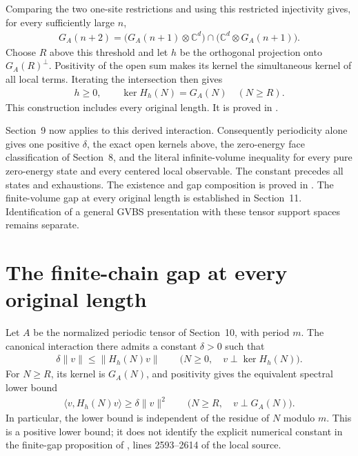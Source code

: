 \documentclass{article}
\begin{document}
Comparing the two one-site restrictions and using this restricted
injectivity gives, for every sufficiently large $n$,
\begin{align}
 G_A(n+2)=\bigl(G_A(n+1)\otimes\mathbb C^d\bigr)
             \cap\bigl(\mathbb C^d\otimes G_A(n+1)\bigr).
\end{align}
Choose $R$ above this threshold and let $h$ be the orthogonal projection onto
$G_A(R)^\perp$. Positivity of the open sum makes its kernel the simultaneous
kernel of all local terms. Iterating the intersection then gives
\begin{align}
 h\geq0,\qquad \ker H_h(N)=G_A(N)\quad(N\geq R).
\end{align}
This construction includes every original length. It is proved in
.

Section~9 now applies to this derived interaction. Consequently periodicity
alone gives one positive $\delta$, the exact open kernels above, the
zero-energy face classification of Section~8, and the literal
infinite-volume inequality for every pure zero-energy state and every
centered local observable. The constant precedes all states and exhaustions.
The existence and gap composition is proved in
.
The finite-volume gap at every original length is established in
Section~11. Identification of a general GVBS presentation with these tensor
support spaces remains separate.

\section{The finite-chain gap at every original length}

Let $A$ be the normalized periodic tensor of Section~10, with period $m$.
The canonical interaction there admits a constant $\delta>0$ such that
\begin{align}
  \delta\|v\|\leq\|H_h(N)v\|
  \qquad\bigl(N\geq0,\quad v\perp\ker H_h(N)\bigr).
\end{align}
For $N\geq R$, its kernel is $G_A(N)$, and positivity gives the equivalent
spectral lower bound
\begin{align}
  \langle v,H_h(N)v\rangle\geq\delta\|v\|^2
  \qquad\bigl(N\geq R,\quad v\perp G_A(N)\bigr).
\end{align}
In particular, the lower bound is independent of the residue of $N$ modulo
$m$. This is a positive lower bound; it does not identify the
explicit numerical constant in the finite-gap proposition of
\cite{Nachtergaele1996Spectral}, lines 2593--2614 of the local source.
\end{document}
